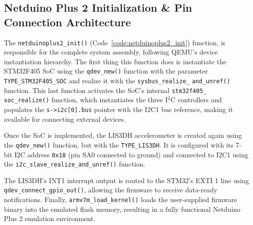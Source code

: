 \subsection{Netduino Plus 2 Initialization \& Pin Connection Architecture}

The \texttt{netduinoplus2\_init()} (Code~\ref{code:netduinoplus2_init}) function, is responsible for the complete system 
assembly, following QEMU's device instantiation hierarchy. The first thing this 
function does is instantiate the STM32F405 SoC using the \texttt{qdev\_new()} function with the parameter \texttt{TYPE\_STM32F405\_SOC} 
and realize it with the \texttt{sysbus\_realize\_} \texttt{and\_unref()} function. 
This last function activates the SoC's internal \texttt{stm32f405\_} \texttt{soc\_realize()} 
function, which instantiates the three I$^2$C controllers and populates the 
\texttt{s->i2c[0].bus} pointer with the I2C1 bus reference, making it available 
for connecting external devices. 

Once the SoC is implemented, the LIS3DH accelerometer is created again using 
the \texttt{qdev\_new()} function, but with the \texttt{TYPE\_LIS3DH}. It is configured with its 7-bit 
I2C address \texttt{0x18} (pin SA0 connected to ground) and connected to I2C1 using the 
\texttt{i2c\_slave\_realize\_and\_unref()} function.


The LIS3DH's INT1 interrupt output is routed to the STM32's EXTI 1 line using 
\texttt{qdev\_connect\_gpio\_out()}, allowing the firmware to receive data-ready 
notifications. Finally, \texttt{armv7m\_load\_kernel()} loads the user-supplied 
firmware binary into the emulated flash memory, resulting in a fully functional 
Netduino Plus 2 emulation environment.

\newpage

